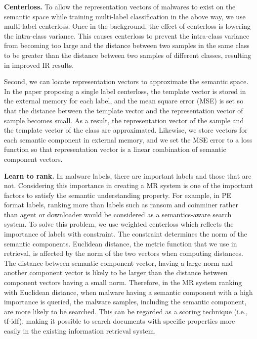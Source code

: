 \textbf{Centerloss. }
To allow the representation vectors of malwares to exist on the semantic space while training multi-label classification in the above way, we use multi-label centerloss. Once in the background, the effect of centerloss is lowering the intra-class variance. This causes centerloss to prevent the intra-class variance from becoming too large and the distance between two samples in the same class to be greater than the distance between two samples of different classes, resulting in improved IR results.

Second, we can locate representation vectors to approximate the semantic space. In the paper proposing a single label centerloss, the template vector is stored in the external memory for each label, and the mean square error (MSE) is set so that the distance between the template vector and the representation vector of sample becomes small. As a result, the representation vector of the sample and the template vector of the class are approximated. Likewise, we store vectors for each semantic component in external memory, and we set the MSE error to a loss function so that representation vector is a linear combination of semantic component vectors.




\textbf{Learn to rank. }
In malware labels, there are important labels and those that are not. Considering this importance in creating a MR system is one of the important factors to satisfy the semantic understanding property. For example, in PE format labels, ranking more than labels such as ransom and coinminer rather than agent or downloader would be considered as a semantics-aware search system. To solve this problem, we use weighted centerloss which reflects the importance of labels with constraint. The constraint determines the norm of the semantic components. Euclidean distance, the metric function that we use in retrieval, is affected by the norm of the two vectors when computing distances. The distance between semantic component vector, having a large norm and another component vector is likely to be larger than the distance between component vectors having a small norm. Therefore, in the MR system ranking with Euclidean distance, when malware having a semantic component with a high importance is queried, the malware samples, including the semantic component, are more likely to be searched. This can be regarded as a scoring technique (i.e., tf-idf\cite{baeza1999modern}), making it possible to search documents with specific properties more easily in the existing information retrieval system.
 


